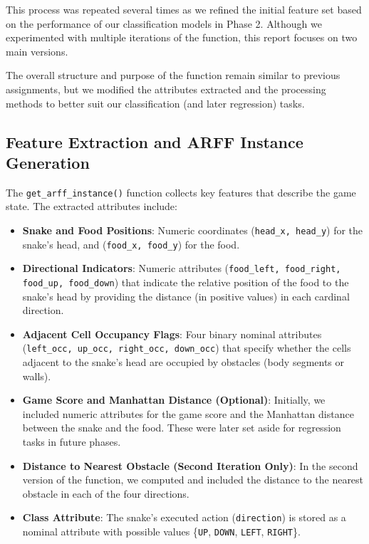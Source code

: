 \documentclass[12pt,a4paper]{article}
\begin{document}
This process was repeated several times as we refined the initial feature set based on the performance of our classification models in Phase 2. Although we experimented with multiple iterations of the function, this report focuses on two main versions.

The overall structure and purpose of the function remain similar to previous assignments, but we modified the attributes extracted and the processing methods to better suit our classification (and later regression) tasks.

\subsection{Feature Extraction and ARFF Instance Generation}

The \texttt{get\_arff\_instance()} function collects key features that describe the game state. The extracted attributes include:

\begin{itemize}
    \item \textbf{Snake and Food Positions}: Numeric coordinates (\texttt{head\_x, head\_y}) for the snake's head, and (\texttt{food\_x, food\_y}) for the food.
    \item \textbf{Directional Indicators}: Numeric attributes (\texttt{food\_left, food\_right, food\_up, food\_down}) that indicate the relative position of the food to the snake's head by providing the distance (in positive values) in each cardinal direction.
    \item \textbf{Adjacent Cell Occupancy Flags}: Four binary nominal attributes (\texttt{left\_occ, up\_occ, right\_occ, down\_occ}) that specify whether the cells adjacent to the snake’s head are occupied by obstacles (body segments or walls).
    \item \textbf{Game Score and Manhattan Distance (Optional)}: Initially, we included numeric attributes for the game score and the Manhattan distance between the snake and the food. These were later set aside for regression tasks in future phases.
    \item \textbf{Distance to Nearest Obstacle (Second Iteration Only)}: In the second version of the function, we computed and included the distance to the nearest obstacle in each of the four directions.
    \item \textbf{Class Attribute}: The snake’s executed action (\texttt{direction}) is stored as a nominal attribute with possible values \{\texttt{UP}, \texttt{DOWN}, \texttt{LEFT}, \texttt{RIGHT}\}.
\end{itemize}
\end{document}
